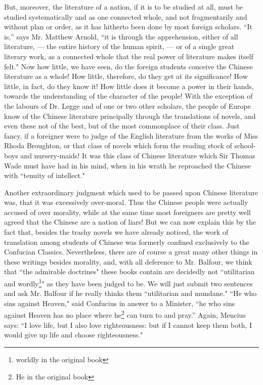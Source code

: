 But, moreover, the literature of a nation, if it is to be studied at all, must be studied systematically and as one connected whole, and not fragmentarily and without plan or order, as it has hitherto been done by most foreign scholars.
``It is,'' says Mr. Matthew Arnold, ``it is through the apprehension, either of all literature, --- the entire history of the human spirit, --- or of a single great literary work, as a connected whole that the real power of literature makes itself felt."
Now how little, we have seen, do the foreign students conceive the Chinese literature as a whole!
How little, therefore, do they get at its significance!
How little, in fact, do they know it!
How little does it become a power in their hands, towards the understanding of the character of the people!
With the exception of the labours of Dr. Legge and of one or two other scholars, the people of Europe know of the Chinese literature principally through the translations of novels, and even these not of the best, but of the most commonplace of their class.
Just fancy, if a foreigner were to judge of the English literature from the works of Miss Rhoda Broughton, or that class of novels which form the reading stock of school-boys and nursery-maids!
It was this class of Chinese literature which Sir Thomas Wade must have had in his mind, when in his wrath he reproached the Chinese with ``tenuity of intellect."

Another extraordinary judgment which used to be passed upon Chinese literature was, that it was excessively over-moral. 
Thus the Chinese people were actually accused of over morality, while at the same time most foreigners are pretty well agreed that the Chinese are a nation of liars!
But we can now explain this by the fact that, besides the trashy novels we have already noticed, the work of translation among students of Chinese was formerly confined exclusively to the Confucian Classics.
Nevertheless, there are of course a great many other things in these writings besides morality, and, with all deference to Mr. Balfour, we think that ``the admirable doctrines" these books contain are decidedly not ``utilitarian and wordly\footnote{worldly in the original book}" as they have been judged to be.
We will just submit two sentences and ask Mr. Balfour if he really thinks them ``utilitarian and mundane."
``He who sins against Heaven," said Confucius in answer to a Minister, ``he who sins against Heaven has no place where he\footnote{He in the original book} can turn to and pray.''
Again, Mencius says: ``I love life, but I also love righteousness: but if I cannot keep them both, I would give up life and choose righteousness."

